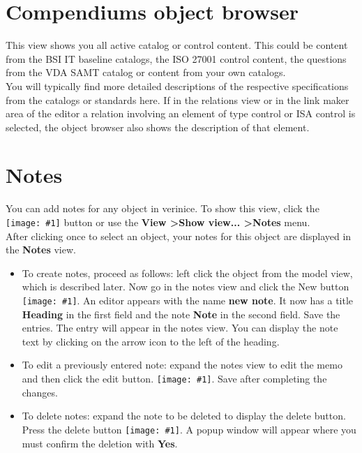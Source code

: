 \documentclass[a4paper,10pt]{book}
\newcommand{\icon}[1]{\texttt{[image: \#1]}}
\begin{document}
\section{Compendiums object browser}
This view shows you all active catalog or control content. This could be content from the BSI IT
baseline catalogs, the ISO 27001 control content, the questions from the VDA SAMT catalog or content from your own catalogs.
\newline\\
You will typically find more detailed descriptions of the respective specifications from the catalogs or standards here.
If in the relations view or in the link maker area of the editor a relation involving an element of type control or ISA control is selected, the object
browser also shows the description of that element.

\section{Notes}
You can add notes for any object in verinice. To show this view, click the \icon{Icon/Notizen.png}
button or use the \textbf{View \textgreater Show view... \textgreater Notes} menu.
\newline\\
After clicking once to select an object, your notes for this object are displayed in the \textbf{Notes} view.
\begin{itemize}
 \item To create notes, proceed as follows: left click the object from the model view, which is described later.
Now go in the notes view and click the New button \icon{Icon/Oeffnen.png}. An editor appears with the name \textbf{new note}.
It now has a title \textbf{Heading} in the first field and the note \textbf{Note} in the second field.
Save the entries. The entry will appear in the notes view. You can display the note text by clicking on the arrow icon to the left of the heading.
\item To edit a previously entered note: expand the notes view to edit the memo and then click the edit button. \icon{Icon/Edit.png}.
Save after completing the changes.
\item To delete notes: expand the note to be deleted to display the delete button.
Press the delete button \icon{Icon/Delete.png}.
A popup window will appear where you must confirm the deletion with \textbf{Yes}.
\end{itemize}
\end{document}
